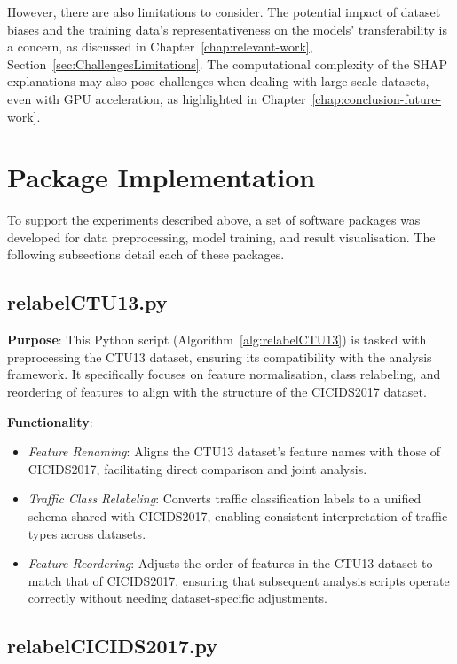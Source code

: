 However, there are also limitations to consider. The potential impact of dataset biases and the training data's representativeness on the models' transferability is a concern, as discussed in Chapter~\ref{chap:relevant-work}, Section~\ref{sec:ChallengesLimitations}. The computational complexity of the SHAP explanations may also pose challenges when dealing with large-scale datasets, even with GPU acceleration, as highlighted in Chapter~\ref{chap:conclusion-future-work}.

\section{Package Implementation}

To support the experiments described above, a set of software packages was developed for data preprocessing, model training, and result visualisation. The following subsections detail each of these packages.

\subsection{relabelCTU13.py}

\textbf{Purpose}: This Python script (Algorithm~\ref{alg:relabelCTU13}) is tasked with preprocessing the CTU13 dataset, ensuring its compatibility with the analysis framework. It specifically focuses on feature normalisation, class relabeling, and reordering of features to align with the structure of the CICIDS2017 dataset.

\textbf{Functionality}:

\begin{itemize}
    \item \textit{Feature Renaming}: Aligns the CTU13 dataset's feature names with those of CICIDS2017, facilitating direct comparison and joint analysis.
    \item \textit{Traffic Class Relabeling}: Converts traffic classification labels to a unified schema shared with CICIDS2017, enabling consistent interpretation of traffic types across datasets.
    \item \textit{Feature Reordering}: Adjusts the order of features in the CTU13 dataset to match that of CICIDS2017, ensuring that subsequent analysis scripts operate correctly without needing dataset-specific adjustments.
\end{itemize}

\subsection{relabelCICIDS2017.py}

